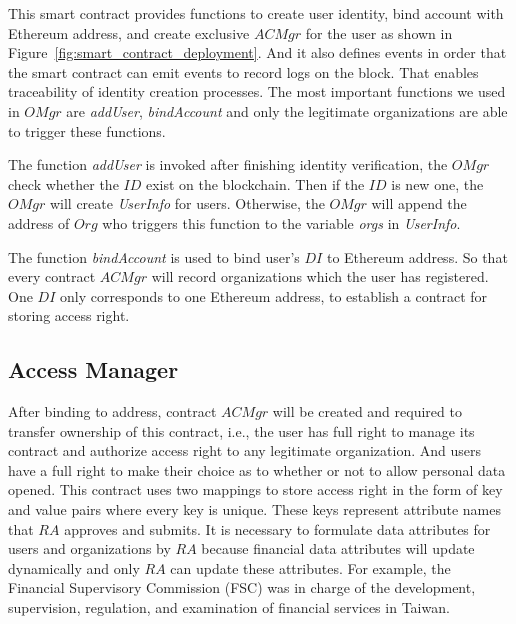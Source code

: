 

This smart contract provides functions to create user identity, bind account with Ethereum address, and create exclusive \(ACMgr\) for the user as shown in Figure~\ref{fig:smart_contract_deployment}. And it also defines events in order that the smart contract can emit events to record logs on the block. That enables traceability of identity creation processes. The most important functions we used in \(OMgr\) are \textit{addUser}, \textit{bindAccount} and only the legitimate organizations are able to trigger these functions.\par 
The function \textit{addUser} is invoked after finishing identity verification, the \(OMgr\) check whether the \(ID\) exist on the blockchain. Then if the \(ID\) is new one, the \(OMgr\) will create \textit{UserInfo} for users. Otherwise, the \(OMgr\) will append the address of \(Org\) who triggers this function to the variable \textit{orgs} in \textit{UserInfo}.\par 
The function \textit{bindAccount} is used to bind user's \(DI\) to Ethereum address. So that every contract \(ACMgr\) will record organizations which the user has registered. One \(DI\) only corresponds to one Ethereum address,  to establish a contract for storing access right.\par 

\subsection*{Access Manager}
After binding to address, contract \(ACMgr\) will be created and required to transfer ownership of this contract, i.e., the user has full right to manage its contract and authorize access right to any legitimate organization. And users have a full right to make their choice as to whether or not to allow personal data opened. This contract uses two mappings to store access right in the form of key and value pairs where every key is unique. These keys represent attribute names that \(RA\) approves and submits. It is necessary to formulate data attributes for users and organizations by \(RA\) because financial data attributes will update dynamically and only \(RA\) can update these attributes. For example, the Financial Supervisory Commission (FSC) was in charge of the development, supervision, regulation, and examination of financial services in Taiwan.

